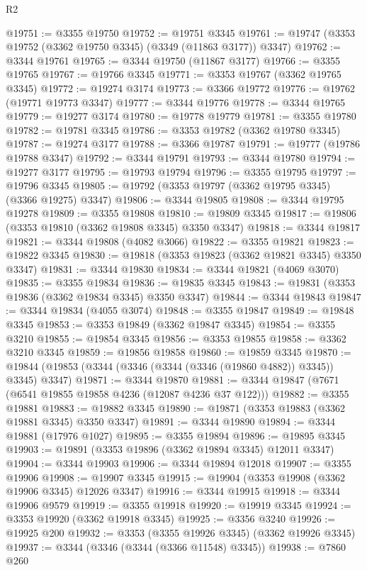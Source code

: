 \begin{lexlean}{R2}
\begin{coremodule}
@19751 := @3355 @19750
@19752 := @19751 @3345
@19761 := @19747 (@3353 @19752 (@3362 @19750 @3345) (@3349 (@11863 @3177)) @3347)
@19762 := @3344 @19761
@19765 := @3344 @19750 (@11867 @3177)
@19766 := @3355 @19765
@19767 := @19766 @3345
@19771 := @3353 @19767 (@3362 @19765 @3345)
@19772 := @19274 @3174
@19773 := @3366 @19772
@19776 := @19762 (@19771 @19773 @3347)
@19777 := @3344 @19776
@19778 := @3344 @19765
@19779 := @19277 @3174
@19780 := @19778 @19779
@19781 := @3355 @19780
@19782 := @19781 @3345
@19786 := @3353 @19782 (@3362 @19780 @3345)
@19787 := @19274 @3177
@19788 := @3366 @19787
@19791 := @19777 (@19786 @19788 @3347)
@19792 := @3344 @19791
@19793 := @3344 @19780
@19794 := @19277 @3177
@19795 := @19793 @19794
@19796 := @3355 @19795
@19797 := @19796 @3345
@19805 := @19792 (@3353 @19797 (@3362 @19795 @3345) (@3366 @19275) @3347)
@19806 := @3344 @19805
@19808 := @3344 @19795 @19278
@19809 := @3355 @19808
@19810 := @19809 @3345
@19817 := @19806 (@3353 @19810 (@3362 @19808 @3345) @3350 @3347)
@19818 := @3344 @19817
@19821 := @3344 @19808 (@4082 @3066)
@19822 := @3355 @19821
@19823 := @19822 @3345
@19830 := @19818 (@3353 @19823 (@3362 @19821 @3345) @3350 @3347)
@19831 := @3344 @19830
@19834 := @3344 @19821 (@4069 @3070)
@19835 := @3355 @19834
@19836 := @19835 @3345
@19843 := @19831 (@3353 @19836 (@3362 @19834 @3345) @3350 @3347)
@19844 := @3344 @19843
@19847 := @3344 @19834 (@4055 @3074)
@19848 := @3355 @19847
@19849 := @19848 @3345
@19853 := @3353 @19849 (@3362 @19847 @3345)
@19854 := @3355 @3210
@19855 := @19854 @3345
@19856 := @3353 @19855
@19858 := @3362 @3210 @3345
@19859 := @19856 @19858
@19860 := @19859 @3345
@19870 := @19844 (@19853 (@3344 (@3346 (@3344 (@3346 (@19860 @4882)) @3345)) @3345) @3347)
@19871 := @3344 @19870
@19881 := @3344 @19847 (@7671 (@6541 @19855 @19858 @4236 (@12087 @4236 @37 @122)))
@19882 := @3355 @19881
@19883 := @19882 @3345
@19890 := @19871 (@3353 @19883 (@3362 @19881 @3345) @3350 @3347)
@19891 := @3344 @19890
@19894 := @3344 @19881 (@17976 @1027)
@19895 := @3355 @19894
@19896 := @19895 @3345
@19903 := @19891 (@3353 @19896 (@3362 @19894 @3345) @12011 @3347)
@19904 := @3344 @19903
@19906 := @3344 @19894 @12018
@19907 := @3355 @19906
@19908 := @19907 @3345
@19915 := @19904 (@3353 @19908 (@3362 @19906 @3345) @12026 @3347)
@19916 := @3344 @19915
@19918 := @3344 @19906 @9579
@19919 := @3355 @19918
@19920 := @19919 @3345
@19924 := @3353 @19920 (@3362 @19918 @3345)
@19925 := @3356 @3240
@19926 := @19925 @200
@19932 := @3353 (@3355 @19926 @3345) (@3362 @19926 @3345)
@19937 := @3344 (@3346 (@3344 (@3366 @11548) @3345))
@19938 := @7860 @260

\end{coremodule}
\end{lexlean}
